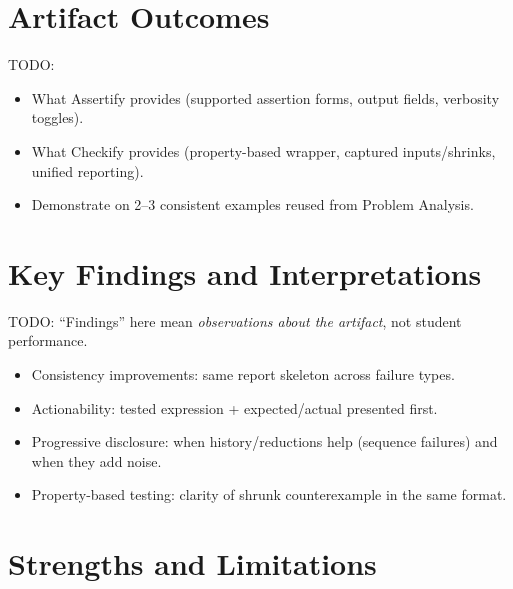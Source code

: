 \documentclass[
	bibliography=totoc,
	listof=totoc,
]{scrbook}
\begin{document}
\section{Artifact Outcomes} %

\begin{marker}\begin{justify}
TODO:
\begin{itemize}
    \item What Assertify provides (supported assertion forms, output fields, verbosity toggles).
    \item What Checkify provides (property-based wrapper, captured inputs/shrinks, unified reporting).
    \item Demonstrate on 2--3 consistent examples reused from Problem Analysis.
\end{itemize}
\end{justify}\end{marker}


\section{Key Findings and Interpretations} %

\begin{marker}\begin{justify}
TODO: ``Findings'' here mean \emph{observations about the artifact}, not student performance.
\begin{itemize}
    \item Consistency improvements: same report skeleton across failure types.
    \item Actionability: tested expression + expected/actual presented first.
    \item Progressive disclosure: when history/reductions help (sequence failures) and when they add noise.
    \item Property-based testing: clarity of shrunk counterexample in the same format.
\end{itemize}
\end{justify}\end{marker}


\section{Strengths and Limitations} %
\end{document}
